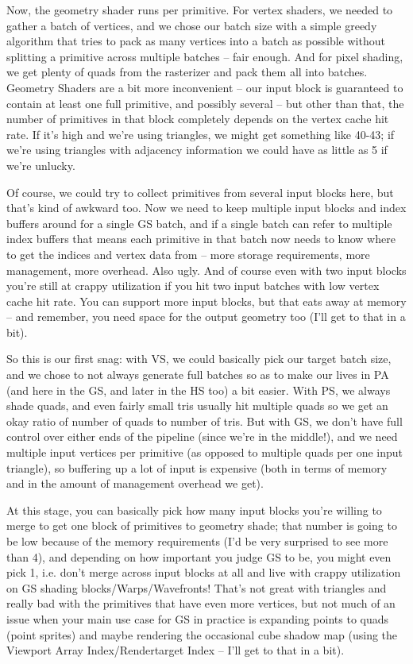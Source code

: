 \documentclass[12pt]{article}
\begin{document}
Now, the geometry shader runs per primitive. For vertex shaders, we needed to gather a batch of vertices, and we chose our batch size with a simple greedy algorithm that tries to pack as many vertices into a batch as possible without splitting a primitive across multiple batches – fair enough. And for pixel shading, we get plenty of quads from the rasterizer and pack them all into batches. Geometry Shaders are a bit more inconvenient – our input block is guaranteed to contain at least one full primitive, and possibly several – but other than that, the number of primitives in that block completely depends on the vertex cache hit rate. If it’s high and we’re using triangles, we might get something like 40-43; if we’re using triangles with adjacency information we could have as little as 5 if we’re unlucky.

Of course, we could try to collect primitives from several input blocks here, but that’s kind of awkward too. Now we need to keep multiple input blocks and index buffers around for a single GS batch, and if a single batch can refer to multiple index buffers that means each primitive in that batch now needs to know where to get the indices and vertex data from – more storage requirements, more management, more overhead. Also ugly. And of course even with two input blocks you’re still at crappy utilization if you hit two input batches with low vertex cache hit rate. You can support more input blocks, but that eats away at memory – and remember, you need space for the output geometry too (I’ll get to that in a bit).

So this is our first snag: with VS, we could basically pick our target batch size, and we chose to not always generate full batches so as to make our lives in PA (and here in the GS, and later in the HS too) a bit easier. With PS, we always shade quads, and even fairly small tris usually hit multiple quads so we get an okay ratio of number of quads to number of tris. But with GS, we don’t have full control over either ends of the pipeline (since we’re in the middle!), and we need multiple input vertices per primitive (as opposed to multiple quads per one input triangle), so buffering up a lot of input is expensive (both in terms of memory and in the amount of management overhead we get).

At this stage, you can basically pick how many input blocks you’re willing to merge to get one block of primitives to geometry shade; that number is going to be low because of the memory requirements (I’d be very surprised to see more than 4), and depending on how important you judge GS to be, you might even pick 1, i.e. don’t merge across input blocks at all and live with crappy utilization on GS shading blocks/Warps/Wavefronts! That’s not great with triangles and really bad with the primitives that have even more vertices, but not much of an issue when your main use case for GS in practice is expanding points to quads (point sprites) and maybe rendering the occasional cube shadow map (using the Viewport Array Index/Rendertarget Index – I’ll get to that in a bit).
\end{document}
